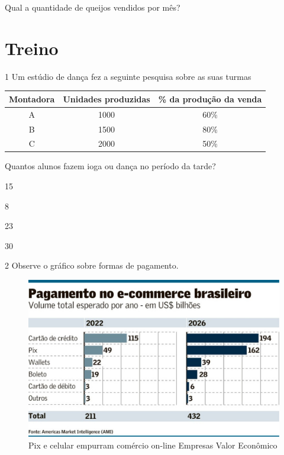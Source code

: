 Qual a quantidade de queijos vendidos por mês?


\section*{Treino}

\num{1}
  Um estúdio de dança fez a seguinte pesquisa sobre as suas turmas 

\begin{center}
\begin{tabular}{c|c|c}
\hline
\multicolumn{1}{|c|}{\textbf{Montadora}} & \textbf{Unidades produzidas} & \multicolumn{1}{c|}{\textbf{\% da produção da venda}} \\ \hline
A & 1000 & 60\% \\ \hline
B & 1500 & 80\% \\ \hline
C & 2000 & 50\% \\ \hline
\end{tabular}
\end{center}

Quantos alunos fazem ioga ou dança no período da tarde?

\begin{escolha}

  \item 15

  \item 8

  \item 23

  \item 30

\end{escolha}

\pagebreak
\num{2} Observe o gráfico sobre formas de pagamento. 

\begin{figure}[htpb!]
\centering
\includegraphics[width=\textwidth]{./_SAEB_9_MAT/media/image225.jpeg}
\caption{Pix e celular empurram comércio on-line \textbar{} Empresas
\textbar{} Valor Econômico}
\end{figure}

